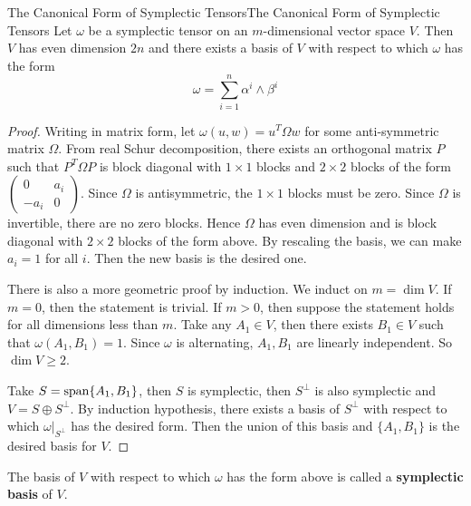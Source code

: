 \documentclass[../main.tex]{subfiles}
\begin{document}
\begin{proposition}{The Canonical Form of Symplectic Tensors}{The Canonical Form of Symplectic Tensors}
  Let $\omega$ be a symplectic tensor on an $m$-dimensional vector space $V$. Then $V$ has even dimension $2n$ and there exists a basis of $V$ with respect to which $\omega$ has the form
  \begin{equation}
    \omega = \sum_{i=1}^n \alpha^i \wedge \beta^i
  \end{equation}
\end{proposition}
\begin{proof}
  Writing in matrix form, let $\omega(u,w) = u^T \Omega w$ for some anti-symmetric matrix $\Omega$. From real Schur decomposition, there exists an orthogonal matrix $P$ such that $P^T \Omega P$ is block diagonal with $1\times 1$ blocks and $2\times 2$ blocks of the form $\begin{pmatrix}0 & a_i \\ -a_i & 0\end{pmatrix}$. Since $\Omega$ is antisymmetric, the $1\times 1$ blocks must be zero. Since $\Omega$ is invertible, there are no zero blocks. Hence $\Omega$ has even dimension and is block diagonal with $2\times 2$ blocks of the form above. By rescaling the basis, we can make $a_i = 1$ for all $i$. Then the new basis is the desired one.
  
  There is also a more geometric proof by induction. We induct on $m = \dim V$. If $m = 0$, then the statement is trivial. If $m > 0$, then suppose the statement holds for all dimensions less than $m$. Take any $A_1 \in V$, then there exists $B_1 \in V$ such that $\omega(A_1, B_1) = 1$. Since $\omega$ is alternating, $A_1,B_1$ are linearly independent. So $\dim V \geq 2$.

  Take $S = \operatorname{span}\{A_1, B_1\}$, then $S$ is symplectic, then $S^\perp$ is also symplectic and $V = S \oplus S^\perp$. By induction hypothesis, there exists a basis of $S^\perp$ with respect to which $\omega|_{S^\perp}$ has the desired form. Then the union of this basis and $\{A_1, B_1\}$ is the desired basis for $V$.
\end{proof}
The basis of $V$ with respect to which $\omega$ has the form above is called a \textbf{symplectic basis} of $V$.
\end{document}
